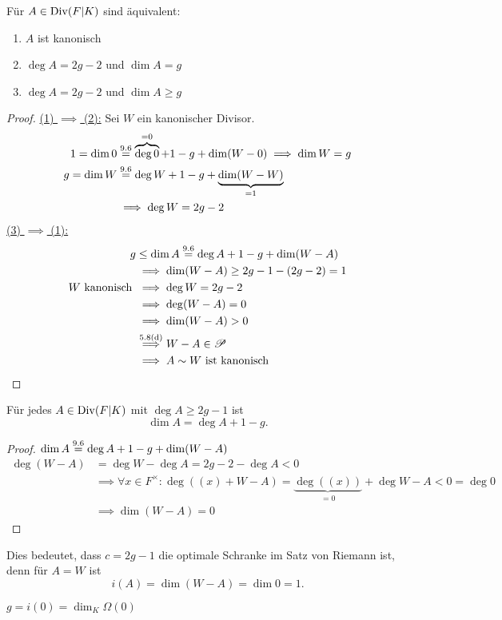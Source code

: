 \begin{korollar}
    Für $A \in \operatorname{Div}(F|K)$ sind äquivalent:
    \begin{enumerate}[label=(\arabic*)]
        \item $A$ ist kanonisch
        \item $\deg A = 2 g - 2$ und $\dim A = g$
        \item $\deg A = 2 g - 2$ und $\dim A \geq g$
    \end{enumerate}
\end{korollar}
\begin{proof}
    \underline{(1) $ \implies$ (2):} Sei $W$ ein kanonischer Divisor.
    \begin{align*}
        1 = \dim 0 &\overset{9.6}{=} \overbrace{\deg 0}^{=0} + 1 - g+ \dim(W-0) \implies \dim W = g\\
        g = \dim W &\overset{9.6}{=} \deg W + 1 - g + \underbrace{\dim (W-W)}_{=1}\\
        & \implies \deg W = 2 g - 2
    \end{align*}
    \underline{(3) $ \implies$ (1):}
    \begin{align*}
        g &\leq \dim A \overset{9.6}{=} \deg A + 1 - g + \dim(W-A)\\
        & \implies \dim (W-A) \geq 2g -1 - (2g - 2) = 1\\
        W \text{ kanonisch } &\implies \deg W = 2g -2\\
        & \implies \deg(W-A) = 0\\
        & \implies \dim(W-A)>0\\
        & \stackrel{\text{5.8(d)}}{\implies} W-A \in \mathscr{P}\\
        & \implies A\sim W \text{ ist kanonisch}
    \end{align*}
\end{proof}

\begin{korollar}
    Für jedes $A \in \operatorname{Div}(F|K)$ mit $\deg A \geq 2g -1$ ist
    $$ \dim A = \deg A + 1 -g.$$
\end{korollar}
\begin{proof}
    $ \dim A \overset{9.6}{=} \deg A + 1 - g + \dim (W-A)$
    \begin{align*}
        \deg (W-A) &= \deg W - \deg A = 2g -2 - \deg A < 0\\
        & \implies \forall x \in F^\times: \deg ((x) + W - A) = \underbrace{\deg ((x))}_{=0} + \deg W-A < 0 = \deg 0\\
        & \implies \dim(W-A) = 0
    \end{align*}
\end{proof}

\begin{bemerkungnr}
    Dies bedeutet, dass $c = 2g -1$ die optimale Schranke im Satz von Riemann ist, denn für $A=W$ ist 
    $$ i(A) = \dim (W-A) = \dim 0 = 1.$$
\end{bemerkungnr}

\begin{bemerkungnr}
    $g = i(0) = \dim_K \Omega(0)$
\end{bemerkungnr}